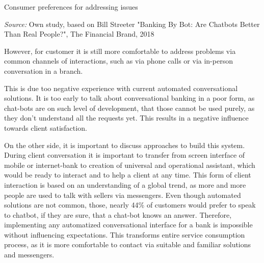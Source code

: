 \begin{table}
    \centering
    \caption{Consumer preferences for addressing issues}
    \medskip
    \footnotesize
    \textit{Source:} Own study, based on Bill Streeter "Banking By Bot: Are Chatbots Better Than Real People?", The Financial Brand, 2018
\end{table}
    
However, for customer it is still more comfortable to address problems via common channels of interactions, such as via phone calls or via in-person conversation in a branch.
\cite{humley_banking_report}

This is due too negative experience with current automated conversational solutions.
It is too early to talk about conversational banking in a poor form, as chat-bots are on such level of development, that those cannot be used purely, as they don't understand all the requests yet.
This results in a negative influence towards client satisfaction.

On the other side, it is important to discuss approaches to build this system.
During client conversation it is important to transfer from screen interface of mobile or internet-bank to creation of universal and operational assistant, which would be ready to interact and to help a client at any time.
This form of client interaction is based on an understanding of a global trend, as more and more people are used to talk with sellers via messengers.
Even though automated solutions are not common, those, nearly 44\% of customers would prefer to speak to chatbot, if they are sure, that a chat-bot knows an answer.
\cite{humley_banking_report}
Therefore, implementing any automatized conversational interface for a bank is impossible without influencing expectations.
This transforms entire service consumption process, as it is more comfortable to contact via suitable and familiar solutions and messengers.

